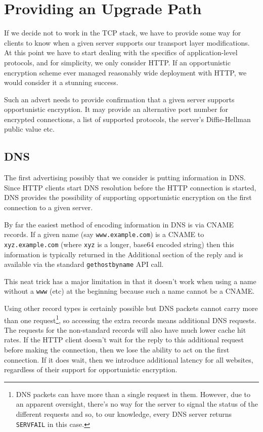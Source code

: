 \documentclass[conference]{IEEEtran}
\begin{document}
\section{Providing an Upgrade Path}

If we decide not to work in the TCP stack, we have to provide some way for
clients to know when a given server supports our transport layer modifications.
At this point we have to start dealing with the specifics of application-level
protocols, and for simplicity, we only consider HTTP. If an opportunistic
encryption scheme ever managed reasonably wide deployment with HTTP, we would
consider it a stunning success.

Such an advert needs to provide confirmation that a given server supports
opportunistic encryption. It may provide an alternative port number for
encrypted connections, a list of supported protocols, the server's
Diffie-Hellman public value etc.

\subsection{DNS}

The first advertising possibly that we consider is putting information in DNS.
Since HTTP clients start DNS resolution before the HTTP connection is started,
DNS provides the possibility of supporting opportunistic encryption on the
first connection to a given server.

By far the easiest method of encoding information in DNS is via CNAME records.
If a given name (say {\tt www.example.com}) is a CNAME to {\tt xyz.example.com}
(where {\tt xyz} is a longer, base64 encoded string) then this information is
typically returned in the Additional section of the reply\cite{rfc1035} and is
available via the standard {\tt gethostbyname} API call.

This neat trick has a major limitation in that it doesn't work when using a
name without a {\tt www} (etc) at the beginning because such a name cannot be a
CNAME.

Using other record types is certainly possible but DNS packets cannot
carry more than one request\footnote{DNS packets can have more than a single
request in them. However, due to an apparent oversight, there's no way for the
server to signal the status of the different requests and so, to our knowledge,
every DNS server returns {\tt SERVFAIL} in this case.}, so accessing the extra
records means additional DNS requests. The requests for the non-standard
records will also have much lower cache hit rates. If the HTTP client doesn't
wait for the reply to this additional request before making the connection,
then we lose the ability to act on the first connection. If it does wait, then
we introduce additional latency for all websites, regardless of their support
for opportunistic encryption.
\end{document}
